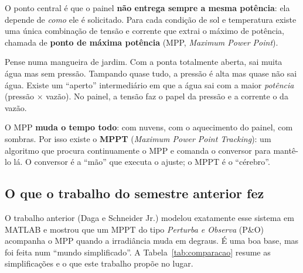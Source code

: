 \documentclass[11pt,a4paper]{article}
\begin{document}
O ponto central é que o painel \textbf{não entrega sempre a mesma potência}: ela depende de
\emph{como} ele é solicitado. Para cada condição de sol e temperatura existe uma única
combinação de tensão e corrente que extrai o máximo de potência, chamada de \textbf{ponto
de máxima potência} (MPP, \emph{Maximum Power Point}).

\begin{intuicao}[: a mangueira]
Pense numa mangueira de jardim. Com a ponta totalmente aberta, sai muita água mas sem
pressão. Tampando quase tudo, a pressão é alta mas quase não sai água. Existe um ``aperto''
intermediário em que a água sai com a maior \emph{potência} (pressão $\times$ vazão).
No painel, a tensão faz o papel da pressão e a corrente o da vazão.
\end{intuicao}

O MPP \textbf{muda o tempo todo}: com nuvens, com o aquecimento do painel, com sombras.
Por isso existe o \textbf{MPPT} (\emph{Maximum Power Point Tracking}): um algoritmo que procura
continuamente o MPP e comanda o conversor para mantê-lo lá. O conversor é a ``mão'' que
executa o ajuste; o MPPT é o ``cérebro''.

\subsection{O que o trabalho do semestre anterior fez}

O trabalho anterior (Daga e Schneider Jr.) modelou exatamente esse sistema em MATLAB e mostrou
que um MPPT do tipo \emph{Perturba e Observa} (P\&O) acompanha o MPP quando a irradiância muda
em degraus. É uma boa base, mas foi feita num ``mundo simplificado''. A
Tabela~\ref{tab:comparacao} resume as simplificações e o que este trabalho propõe no lugar.
\end{document}
